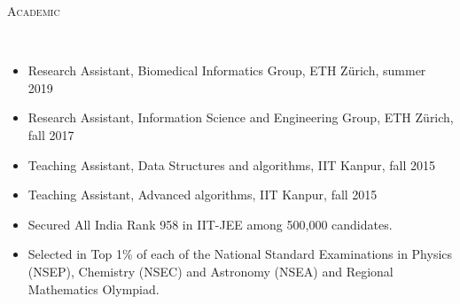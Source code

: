 \documentclass[9pt]{article}
\newenvironment{changemargin}[2]{%
  \begin{list}{}{%
      \setlength{\topsep}{0pt}%
    \setlength{\leftmargin}{#1}%
    \setlength{\rightmargin}{#2}%
    \setlength{\listparindent}{\parindent}%
  \setlength{\itemindent}{\parindent}%
    \setlength{\parsep}{\parskip}%
    }%
  \item[]}{\end{list}
    }
\newcommand{\lineover}{
  \begin{changemargin}{-0.05in}{-0.10in}
    \vspace*{-9pt}
    \hrulefill \\
    \vspace*{-2pt}
  \end{changemargin}
}
\newcommand{\header}[1]{
  \begin{changemargin}{-0.5in}{-0.5in}
    \scshape{#1}\\
        \lineover
  \end{changemargin}
}
\newenvironment{body} {
  \vspace*{-16pt}
        \begin{changemargin}{-0.6in}{-0.65in}
        }	
        {\end{changemargin}
}
\begin{document}


\vspace{2 mm}
\header{Academic}
\begin{body}
  \vspace{14pt}
        \begin{changemargin}{0.15in}{0.15in}
          \begin{itemize}
            \item Research Assistant, Biomedical Informatics Group, ETH Z{\"u}rich, summer 2019
            \item Research Assistant, Information Science and Engineering Group, ETH Z{\"u}rich, fall 2017
            \item Teaching Assistant, Data Structures and algorithms, IIT Kanpur, fall 2015
            \item Teaching Assistant, Advanced algorithms, IIT Kanpur, fall 2015
            \item Secured All India Rank 958 in IIT-JEE among 500,000 candidates.
            \item Selected in Top 1\% of each of the National Standard Examinations 
              in Physics (NSEP), Chemistry (NSEC) and Astronomy (NSEA) and Regional
              Mathematics Olympiad.
          \end{itemize}
        \end{changemargin}
\end{body}
\end{document}
